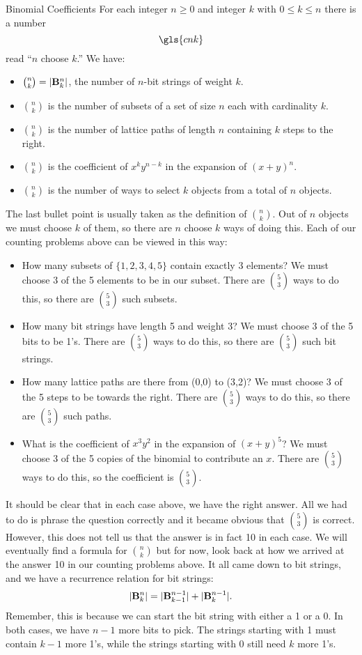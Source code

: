 \documentclass[12pt]{article}
\begin{document}
\begin{defbox}{Binomial Coefficients}
  For each integer $n \ge 0$ and integer $k$ with $0 \le k \le n$ there is a number
  \[\gls{cnk} \]
  read ``$n$ choose $k$.''  We have:
  \begin{itemize}
    \item ${n\choose k} = |\mathbf{B}^n_k|$, the number of $n$-bit strings of weight $k$.
    \item ${n \choose k}$ is the number of subsets of a set of size $n$ each with cardinality $k$.
    \item ${n \choose k}$ is the number of lattice paths of length $n$ containing $k$ steps to the right.
    \item ${n \choose k}$ is the coefficient of $x^ky^{n-k}$ in the expansion of $(x+y)^n$.
    \item ${n \choose k}$ is the number of ways to select $k$ objects from a total of $n$ objects.
  \end{itemize}
\end{defbox}

The last bullet point is usually taken as the definition of ${n \choose k}$.  Out of $n$ objects we must choose $k$ of them, so there are $n$ choose $k$ ways of doing this.  Each of our counting problems above can be viewed in this way:
\begin{itemize}
  \item How many subsets of $\{1,2,3,4,5\}$ contain exactly 3 elements?  We must choose $3$ of the 5 elements to be in our subset.  There are ${5 \choose 3}$ ways to do this, so there are ${5 \choose 3}$ such subsets.
  \item How many bit strings have length 5 and weight 3?  We must choose $3$ of the 5 bits to be 1's.  There are ${5 \choose 3}$ ways to do this, so there are ${5 \choose 3}$ such bit strings.
  \item How many lattice paths are there from (0,0) to (3,2)?  We must choose 3 of the 5 steps to be towards the right.  There are ${5 \choose 3}$ ways to do this, so there are ${5 \choose 3}$ such paths.
  \item What is the coefficient of $x^3y^2$ in the expansion of $(x+y)^5$?  We must choose 3 of the 5 copies of the binomial to contribute an $x$.  There are ${5 \choose 3}$ ways to do this, so the coefficient is ${5 \choose 3}$.
\end{itemize}

It should be clear that in each case above, we have the right answer.  All we had to do is phrase the question correctly and it became obvious that ${5 \choose 3}$ is correct.  However, this does not tell us that the answer is in fact 10 in each case.  We will eventually find a formula for ${n \choose k}$ but for now, look back at how we arrived at the answer 10 in our counting problems above.  It all came down to bit strings, and we have a recurrence relation for bit strings:
\[|\mathbf{B}^n_k| = |\mathbf{B}^{n-1}_{k-1}| + |\mathbf{B}^{n-1}_k|.\]
Remember, this is because we can start the bit string with either a 1 or a 0.  In both cases, we have $n-1$ more bits to pick.  The strings starting with 1 must contain $k-1$ more 1's, while the strings starting with 0 still need $k$ more 1's.
\end{document}
